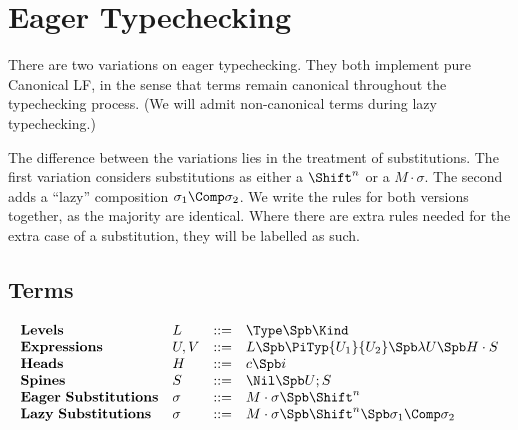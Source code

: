 

\newcommand{\CheckTy}[3][\Gamma]{#1\vdash #2 \Leftarrow #3}
\newcommand{\Focus}[4][\Gamma]{#1\vdash #2 : #3 > #4}
\newcommand{\Equiv}[2]{#1\equiv #2}


\section{Eager Typechecking}

There are two variations on eager typechecking. 
They both implement pure Canonical LF, in the sense that
terms remain canonical throughout the typechecking process.
(We will admit non-canonical terms during lazy typechecking.)

The difference between the variations lies in the treatment
of substitutions. The first variation
considers substitutions as either a $\Shift^n$ or a $M\cdot\sigma$.
The second adds a ``lazy'' composition $\sigma_1\Comp\sigma_2$.
We write the rules for both versions together, as the majority
are identical.  Where there are extra rules needed for the
extra case of a substitution, they will be labelled as such.


\subsection{Terms}

$$
\begin{array}{llll}
\mathbf{Levels} & L & ::= & \Type \Spb \Kind \\
\mathbf{Expressions} & U,V & ::= & L \Spb \PiTyp{U_1}{U_2} \Spb \lambda U \Spb H\cdot S \\
\mathbf{Heads} & H & ::= & c \Spb i\\
\mathbf{Spines} & S & ::= & \Nil \Spb U;S\\
\mathbf{Eager\ Substitutions} & \sigma & ::= & M\cdot\sigma \Spb \Shift^n \\
\mathbf{Lazy\ Substitutions} & \sigma & ::= & M\cdot\sigma \Spb \Shift^n \Spb \sigma_1 \Comp \sigma_2\\
\end{array} 
$$



